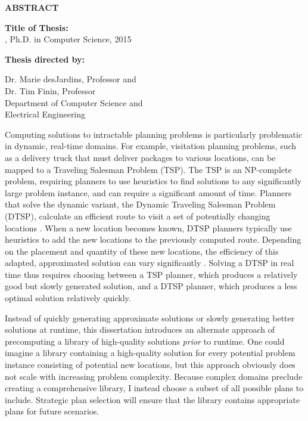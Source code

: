 \newpage
\pagestyle{empty}

\begin{center}
\vspace{0.1in}
\large{\bf ABSTRACT} \par  
\bigskip \bigskip
\end{center}

\begin{flushleft}
{\bf Title of Thesis:} \thesistitle{}\\
\fullname{}, Ph.D. in Computer Science, 2015 \\
\begin{singlespace}
{\bf Thesis directed by:}{\hspace{2.5mm}} \parbox[t]{3in}{Dr. Marie desJardins, Professor and \\ Dr. Tim Finin, Professor \\
Department of Computer Science and \\ Electrical Engineering}
\end{singlespace}
\end{flushleft}


Computing solutions to intractable planning problems is particularly problematic in dynamic, real-time domains.  For example, visitation planning problems, such as a delivery truck that must deliver packages to various locations, can be mapped to a Traveling Salesman Problem (TSP).  The TSP is an NP-complete problem, requiring planners to use heuristics to find solutions to any significantly large problem instance, and can require a significant amount of time.  Planners that solve the dynamic variant, the Dynamic Traveling Salesman Problem (DTSP), calculate an efficient route to visit a set of potentially changing locations \citep{psaraftis88dynamic}.  When a new location becomes known, DTSP planners typically use heuristics to add the new locations to the previously computed route.  Depending on the placement and quantity of these new locations, the efficiency of this adapted, approximated solution can vary significantly \citep{psaraftis95dynamic,laporte00classical,larsen2000dvrp}.  Solving a DTSP in real time thus requires choosing between a TSP planner, which produces a relatively good but slowly generated solution, and a DTSP planner, which produces a less optimal solution relatively quickly.

Instead of quickly generating approximate solutions or slowly generating better solutions at runtime, this dissertation introduces an alternate approach of precomputing a library of high-quality solutions \textit{prior} to runtime.  One could imagine a library containing a high-quality solution for every potential problem instance consisting of potential new locations, but this approach obviously does not scale with increasing problem complexity.  Because complex domains preclude creating a comprehensive library, I instead choose a subset of all possible plans to include. Strategic plan selection will ensure that the library contains appropriate plans for future scenarios.

